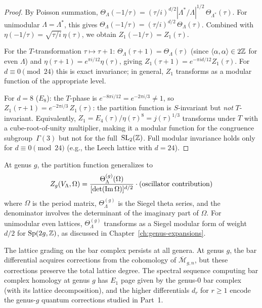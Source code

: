 \begin{proof}
By Poisson summation, $\Theta_\Lambda(-1/\tau) =
(\tau/i)^{d/2} |\Lambda^*/\Lambda|^{1/2}\, \Theta_{\Lambda^*}(\tau)$.
For unimodular $\Lambda = \Lambda^*$, this gives
$\Theta_\Lambda(-1/\tau) = (\tau/i)^{d/2}\, \Theta_\Lambda(\tau)$.
Combined with $\eta(-1/\tau) = \sqrt{\tau/i}\,\eta(\tau)$,
we obtain $Z_1(-1/\tau) = Z_1(\tau)$.

For the $T$-transformation $\tau \mapsto \tau + 1$:
$\Theta_\Lambda(\tau+1) = \Theta_\Lambda(\tau)$ (since
$\langle\alpha,\alpha\rangle \in 2\mathbb{Z}$ for even $\Lambda$) and
$\eta(\tau+1) = e^{\pi i/12}\eta(\tau)$, giving
$Z_1(\tau+1) = e^{-\pi i d/12} Z_1(\tau)$. For $d \equiv 0 \pmod{24}$
this is exact invariance; in general, $Z_1$ transforms as a modular
function of the appropriate level.

For $d = 8$ ($E_8$): the $T$-phase is $e^{-8\pi i/12} = e^{-2\pi i/3} \neq 1$, so
$Z_1(\tau+1) = e^{-2\pi i/3}\, Z_1(\tau)$: the partition function is $S$-invariant
but \emph{not} $T$-invariant.  Equivalently,
$Z_1 = E_4(\tau)/\eta(\tau)^8 = j(\tau)^{1/3}$ transforms under $T$ with a
cube-root-of-unity multiplier, making it a modular function for the congruence
subgroup~$\Gamma(3)$ but not for the full~$\mathrm{SL}_2(\mathbb{Z})$.
Full modular invariance holds only for $d \equiv 0 \pmod{24}$
(e.g., the Leech lattice with $d = 24$).
\end{proof}

\begin{remark}
\label{rem:lattice:higher-genus}
At genus $g$, the partition function generalizes to
\[
Z_g(V_\Lambda, \Omega)
= \frac{\Theta_\Lambda^{(g)}(\Omega)}{[\det(\operatorname{Im}\Omega)]^{d/2}}
\cdot (\text{oscillator contribution})
\]
where $\Omega$ is the period matrix, $\Theta_\Lambda^{(g)}$ is the
Siegel theta series, and the denominator involves the determinant of the
imaginary part of $\Omega$. For unimodular even lattices,
$\Theta_\Lambda^{(g)}$ transforms as a Siegel modular form of weight
$d/2$ for $\operatorname{Sp}(2g, \mathbb{Z})$, as discussed in
Chapter~\ref{ch:genus-expansions}.

The lattice grading on the bar complex
persists at all genera. At genus $g$, the bar differential acquires
corrections from the cohomology of $\overline{\mathcal{M}}_{g,n}$, but these
corrections preserve the total lattice degree. The spectral sequence
computing bar complex homology at genus $g$ has $E_1$ page given by
the genus-0 bar complex (with its lattice decomposition), and the
higher differentials $d_r$ for $r \geq 1$ encode the genus-$g$
quantum corrections studied in Part~1.
\end{remark}

